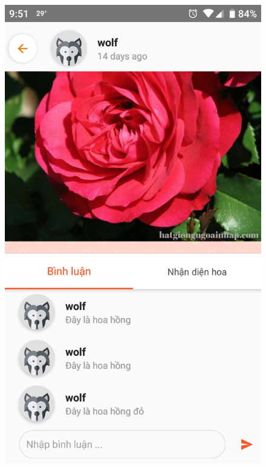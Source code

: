 \documentclass[12pt]{report}
\begin{document}
		\begin{figure}[h]
			\centering
			\includegraphics[scale=0.2]{app_comment}

\end{figure}
\end{document}
